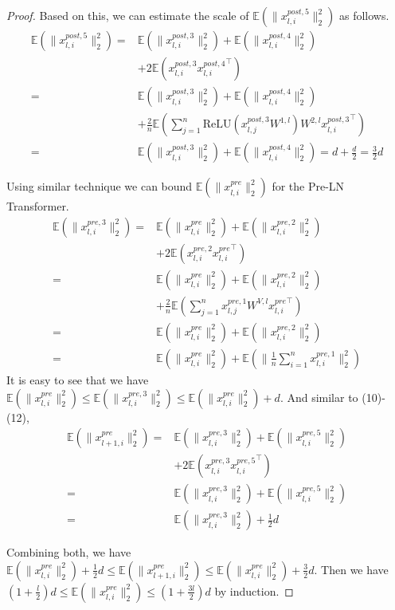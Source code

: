 \documentclass{article}
\begin{document}
\begin{proof}
Based on this, we can estimate the scale of $\mathbb{E}(\|x_{l,i}^{post,5}\|_2^2)$ as follows.
\begin{align}
\mathbb{E}(\|x_{l,i}^{post,5}\|_2^2)=&\mathbb{E}(\|x_{l,i}^{post,3}\|_2^2)+\mathbb{E}(\|x_{l,i}^{post,4}\|_2^2)\nonumber\\
&+2\mathbb{E}(x_{l,i}^{post,3}{x_{l,i}^{post,4}}^{\top})\\
=&\mathbb{E}(\|x_{l,i}^{post,3}\|_2^2)+\mathbb{E}(\|x_{l,i}^{post,4}\|_2^2)\nonumber\\
&+\frac{2}{n}\mathbb{E}(\sum_{j=1}^{n}\text{ReLU}(x^{post,3}_{l,j}W^{1,l}) W^{2, l}{x_{l,i}^{post,3}}^{\top})\\
=&\mathbb{E}(\|x_{l,i}^{post,3}\|_2^2)+\mathbb{E}(\|x_{l,i}^{post,4}\|_2^2)=d+\frac{d}{2}= \frac{3}{2}d
\end{align}


Using similar technique we can bound $\mathbb{E}(\|x_{l,i}^{pre}\|_2^2)$ for the Pre-LN Transformer. 
\begin{align}
\mathbb{E}(\|x_{l,i}^{pre,3}\|_2^2)=&\mathbb{E}(\|x_{l,i}^{pre}\|_2^2)+\mathbb{E}(\|x_{l,i}^{pre,2}\|_2^2)\nonumber\\
&+2\mathbb{E}(x_{l,i}^{pre,2}{x_{l,i}^{pre}}^{\top})\\
=&\mathbb{E}(\|x_{l,i}^{pre}\|_2^2)+\mathbb{E}(\|x_{l,i}^{pre,2}\|_2^2)\nonumber\\
&+\frac{2}{n}\mathbb{E}(\sum_{j=1}^{n}x_{l, j}^{pre,1} W^{V, l}{x_{l,i}^{pre}}^{\top})\\
=&\mathbb{E}(\|x_{l,i}^{pre}\|_2^2)+\mathbb{E}(\|x_{l,i}^{pre,2}\|_2^2)\\
=&\mathbb{E}(\|x_{l,i}^{pre}\|_2^2)+\mathbb{E}(\|\frac{1}{n}\sum_{i=1}^n x_{l,i}^{pre,1}\|_2^2)
\end{align}
It is easy to see that we have $\mathbb{E}(\|x_{l,i}^{pre}\|_2^2) \leq \mathbb{E}(\|x_{l,i}^{pre,3}\|_2^2) \leq \mathbb{E}(\|x_{l,i}^{pre}\|_2^2)+d$. And similar to (10)-(12),
\begin{align}
\mathbb{E}(\|x_{l+1,i}^{pre}\|_2^2)=&\mathbb{E}(\|x_{l,i}^{pre,3}\|_2^2)+\mathbb{E}(\|x_{l,i}^{pre,5}\|_2^2)\nonumber\\
&+2\mathbb{E}(x_{l,i}^{pre,3}{x_{l,i}^{pre,5}}^{\top})\\
=&\mathbb{E}(\|x_{l,i}^{pre,3}\|_2^2)+\mathbb{E}(\|x_{l,i}^{pre,5}\|_2^2)\\
=&\mathbb{E}(\|x_{l,i}^{pre,3}\|_2^2)+\frac{1}{2}d
\end{align}

Combining both, we have $\mathbb{E}(\|x_{l,i}^{pre}\|_2^2) +\frac{1}{2}d\leq\mathbb{E}(\|x_{l+1,i}^{pre}\|_2^2)\leq \mathbb{E}(\|x_{l,i}^{pre}\|_2^2)+\frac{3}{2}d$. Then we have  $(1+\frac{l}{2})d\leq\mathbb{E}(\|x_{l,i}^{pre}\|_2^2)\leq(1+\frac{3l}{2})d$ by induction.
 

\end{proof}
\end{document}
